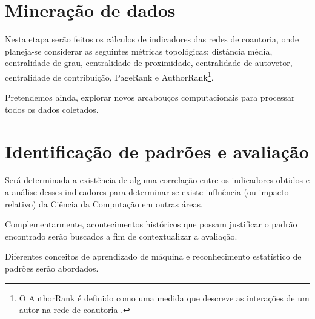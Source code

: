 \section{Mineração de dados}

Nesta etapa serão feitos os cálculos de indicadores das redes de coautoria, onde planeja-se considerar as seguintes métricas topológicas: distância média, centralidade de grau, centralidade de proximidade, centralidade de autovetor, centralidade de contribuição, PageRank e AuthorRank\footnote{O AuthorRank é definido como uma medida que descreve as interações de um autor na rede de coautoria \cite{liu2005co}.}.

Pretendemos ainda, explorar novos arcabouços computacionais para processar todos os dados coletados.

\section{Identificação de padrões e avaliação}

Será determinada a existência de alguma correlação entre os indicadores obtidos e a análise desses indicadores para determinar se existe influência (ou impacto relativo) da Ciência da Computação em outras áreas.

Complementarmente, acontecimentos históricos que possam justificar o padrão encontrado serão buscados a fim de contextualizar a avaliação.

Diferentes conceitos de aprendizado de máquina e reconhecimento estatístico de padrões serão abordados.
